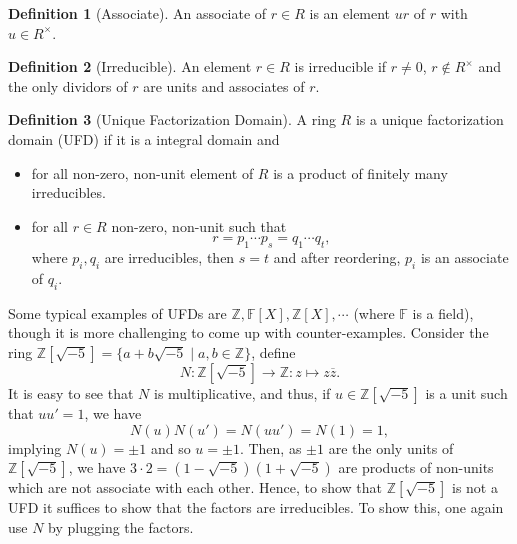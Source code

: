 \documentclass[]{article}
\theoremstyle{definition}
\theoremstyle{definition}
\newtheorem{definition}{Definition}[section]
\begin{document}
\begin{definition}[Associate]
  An associate of \(r \in R\) is an element \(ur\) of \(r\) with \(u \in R^\times\).
\end{definition}

\begin{definition}[Irreducible]
  An element \(r \in R\) is irreducible if \(r \neq 0\), \(r \not\in R^\times\) 
  and the only dividors of \(r\) are units and associates of \(r\).
\end{definition}

\begin{definition}[Unique Factorization Domain]
  A ring \(R\) is a unique factorization domain (UFD) if it is a integral domain 
  and 
  \begin{itemize}
    \item for all non-zero, non-unit element of \(R\) is a product of finitely 
      many irreducibles.
    \item for all \(r \in R\) non-zero, non-unit such that 
    \[r = p_1 \cdots p_s = q_1 \cdots q_t,\]
    where \(p_i, q_i\) are irreducibles, then \(s = t\) and after reordering, 
    \(p_i\) is an associate of \(q_i\).
  \end{itemize}
\end{definition}

Some typical examples of UFDs are \(\mathbb{Z}, \mathbb{F}[X], 
\mathbb{Z}[X], \cdots\) (where \(\mathbb{F}\) is a field), though it is more 
challenging to come up with counter-examples. Consider the ring 
\(\mathbb{Z}[\sqrt{-5}] = \{a + b\sqrt{-5} \mid a, b \in \mathbb{Z}\}\), define 
\[N : \mathbb{Z}[\sqrt{-5}] \to \mathbb{Z} : z \mapsto z \overline{z}.\]
It is easy to see that \(N\) is multiplicative, and thus, if 
\(u \in \mathbb{Z}[\sqrt{-5}]\) is a unit such that \(uu' = 1\), we have
\[N(u)N(u') = N(uu') = N(1) = 1,\]
implying \(N(u) = \pm 1\) and so \(u = \pm 1\). Then, as \(\pm 1\) are the 
only units of \(\mathbb{Z}[\sqrt{-5}]\), we have 
\(3 \cdot 2 = (1 - \sqrt{-5})(1 + \sqrt{-5})\) are products of non-units which 
are not associate with each other. Hence, to show that \(\mathbb{Z}[\sqrt{-5}]\) 
is not a UFD it suffices to show that the factors are irreducibles. To show this, 
one again use \(N\) by plugging the factors. 
\end{document}
